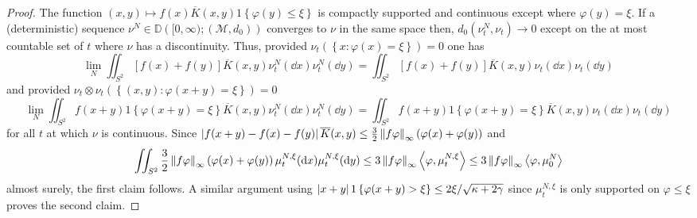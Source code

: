 \begin{proof}
The function $(x,y) \mapsto f(x)\overline{K}(x,y)1\left\{\varphi(y) \leq \xi\right\}$ is compactly supported and continuous except where $\varphi(y) = \xi$.
If a (deterministic) sequence $\nu^N \in \mathbb{D}\left([0,\infty);  \left(\mathcal{M}, d_0\right)\right)$ converges to $\nu$ in the same space then, $d_0\left(\nu^N_t, \nu_t\right) \rightarrow 0$ except on the at most countable set of $t$ where $\nu$ has a discontinuity.
Thus, provided $\nu_t\left(\left\{x\colon \varphi(x) = \xi\right\}\right) = 0$ one has
\begin{equation}
    \lim_N \iint_{S^2}\left[f(x) + f(y)\right]\overline{K}(x,y)\nu^N_t(\dd x)\nu^N_t(\dd y)
    = \iint_{S^2}\left[f(x) + f(y)\right]\overline{K}(x,y)\nu_t(\dd x)\nu_t(\dd y)
\end{equation}
and provided $\nu_t \otimes \nu_t \left(\left\{(x,y) \colon \varphi(x+y) = \xi\right\}\right) = 0$
\begin{equation}
    \lim_N \iint_{S^2}f(x+y)1\left\{\varphi(x+y) = \xi\right\}\overline{K}(x,y)\nu^N_t(\dd x)\nu^N_t(\dd y)
    = \iint_{S^2} f(x+y)1\left\{\varphi(x+y) = \xi\right\}\overline{K}(x,y)\nu_t(\dd x)\nu_t(\dd y)
\end{equation}
for all $t$ at which $\nu$ is continuous.
Since $\left\lvert{f(x+y) - f(x) - f(y)}\right\rvert\overline{K}(x,y) \leq \frac32\left\lVert{f\varphi}\right\rVert_\infty \left(\varphi(x) + \varphi(y)\right)$ and
\begin{equation*}
    \iint_{S^2}\frac32\left\lVert{f\varphi}\right\rVert_\infty \left(\varphi(x) + \varphi(y)\right) \mu^{N,\xi}_t(\mathrm{d} x) \mu^{N,\xi}_t(\mathrm{d} y)
    \leq 3 \left\lVert{f\varphi}\right\rVert_\infty \left<\varphi, \mu^{N,\xi}_t\right>
    \leq 3 \left\lVert{f\varphi}\right\rVert_\infty \left<\varphi, \mu^{N}_0\right>
\end{equation*}
almost surely, the first claim follows.
A similar argument using $\left\lvert{x+y}\right\rvert1\left\{\varphi(x+y) > \xi \right\} \leq 2\xi / \sqrt{\kappa + 2\gamma}$ since $\mu^{N,\xi}_t$ is only supported on $\varphi \leq \xi$ proves the second claim.
\end{proof}

